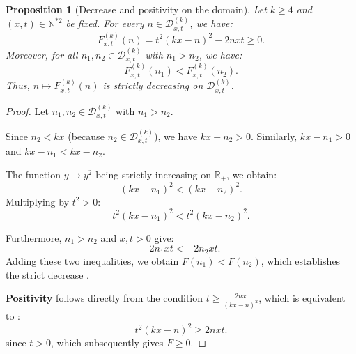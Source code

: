 \documentclass[12pt]{article}
\newtheorem{proposition}{Proposition}
\begin{document}
\begin{proposition}[Decrease and positivity on the domain]
Let \(k \ge 4\) and \((x,t) \in \mathbb{N}^{*2}\) be fixed. For every \(n \in \mathcal{D}_{x,t}^{(k)}\), we have:
\[
F_{x,t}^{(k)}(n) = t^2(kx-n)^2 - 2nxt \ge 0.
\]
Moreover, for all \(n_1, n_2 \in \mathcal{D}_{x,t}^{(k)}\) with \(n_1 > n_2\), we have:
\[
F_{x,t}^{(k)}(n_1) < F_{x,t}^{(k)}(n_2).
\]
Thus, \(n \mapsto F_{x,t}^{(k)}(n)\) is strictly decreasing on \(\mathcal{D}_{x,t}^{(k)}\).
\end{proposition}

\begin{proof}
Let \(n_1,n_2 \in \mathcal{D}_{x,t}^{(k)}\) with \(n_1 > n_2\).

Since \(n_2 < kx\) (because \(n_2 \in \mathcal{D}_{x,t}^{(k)}\)), we have \(kx - n_2 > 0\). Similarly, \(kx - n_1 > 0\) and \(kx - n_1 < kx - n_2\).

The function \(y \mapsto y^2\) being strictly increasing on \(\mathbb{R}_+\), we obtain:
\[
(kx - n_1)^2 < (kx - n_2)^2.
\]
Multiplying by \(t^2 > 0\):
\[
t^2(kx - n_1)^2 < t^2(kx - n_2)^2.
\]

Furthermore, \(n_1 > n_2\) and \(x,t > 0\) give:
\[
-2n_1xt < -2n_2xt.
\] 
Adding these two inequalities, we obtain \(F(n_1) < F(n_2)\), which establishes the strict decrease .

\vspace{0.5em}
\textbf{Positivity} follows directly from the condition \(t \ge \frac{2nx}{(kx-n)^2}\), which is equi\-valent to : 
\[
t^2(kx-n)^2 \ge 2nxt.
\]
since \(t>0\), which subsequently gives \(F \ge 0\).
\end{proof}
\end{document}
